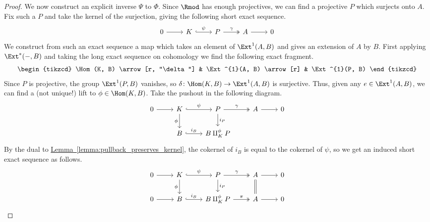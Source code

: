\documentclass[main.tex]{subfiles}
\begin{document}
\begin{proof}
  We now construct an explicit inverse $\Psi$ to $\Phi$. Since $\Rmod$ has enough projectives, we can find a projective $P$ which surjects onto $A$. Fix such a $P$ and take the kernel of the surjection, giving the following short exact sequence.
  \begin{equation}
    \label{eq:ses_with_projective_and_kernel}
    \begin{tikzcd}
      0
      \arrow[r]
      & K
      \arrow[r, hook, "\psi"]
      & P
      \arrow[r, two heads, "\gamma"]
      & A
      \arrow[r]
      & 0
    \end{tikzcd}
  \end{equation}
  We construct from such an exact sequence a map which takes an element of $\Ext^{1}(A, B)$ and gives an extension of $A$ by $B$. First applying $\Ext^{*}(-, B)$ and taking the long exact sequence on cohomology we find the following exact fragment.
  \begin{equation*}
    \begin{tikzcd}
      \Hom(K, B)
      \arrow[r, "\delta"]
      & \Ext^{1}(A, B)
      \arrow[r]
      & \Ext^{1}(P, B)
    \end{tikzcd}
  \end{equation*}
  Since $P$ is projective, the group $\Ext^{1}(P, B)$ vanishes, so $\delta\colon \Hom(K, B) \to \Ext^{1}(A, B)$ is surjective. Thus, given any $e \in \Ext^{1}(A, B)$, we can find a (not unique!) lift to $\phi \in \Hom(K, B)$. Take the pushout in the following diagram.
  \begin{equation*}
    \begin{tikzcd}
      0
      \arrow[r]
      & K
      \arrow[r, hook, "\psi"]
      \arrow[d, swap, "\phi"]
      & P
      \arrow[r, two heads, "\gamma"]
      \arrow[d, "i_{P}"]
      & A
      \arrow[r]
      & 0
      \\
      & B
      \arrow[r, hook, "i_{B}"]
      & B \amalg^{\phi}_{K} P
    \end{tikzcd}
  \end{equation*}
  By the dual to \hyperref[lemma:pullback_preserves_kernel]{Lemma~\ref*{lemma:pullback_preserves_kernel}}, the cokernel of $i_{B}$ is equal to the cokernel of $\psi$, so we get an induced short exact sequence as follows.
  \begin{equation*}
    \begin{tikzcd}
      0
      \arrow[r]
      & K
      \arrow[r, hook, "\psi"]
      \arrow[d, swap, "\phi"]
      & P
      \arrow[r, two heads, "\gamma"]
      \arrow[d, "i_{P}"]
      & A
      \arrow[r]
      \arrow[d, equals]
      & 0
      \\
      0
      \arrow[r]
      & B
      \arrow[r, hook, "i_{B}"]
      & B \amalg^{\phi}_{K} P
      \arrow[r, two heads, "\pi"]
      & A
      \arrow[r]
      & 0
    \end{tikzcd}
  \end{equation*}


\end{proof}
\end{document}

